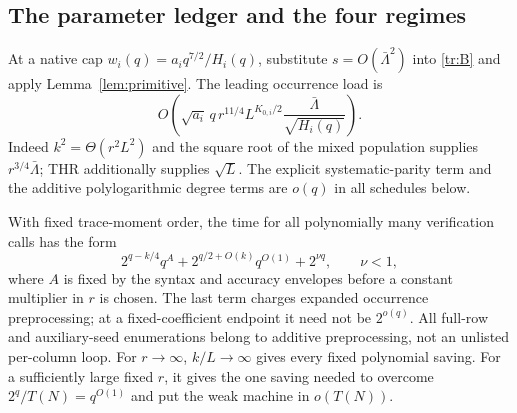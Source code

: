 \documentclass[11pt,letterpaper]{article}
\theoremstyle{definition}
\theoremstyle{remark}
\begin{document}
\subsection{The parameter ledger and the four regimes}
\label{tr:parameters}

At a native cap $w_i(q)=a_iq^{7/2}/H_i(q)$, substitute
$s=O(\bar\Lambda^2)$ into \eqref{tr:B} and apply
Lemma~\ref{lem:primitive}. The leading occurrence load is
\begin{equation}
 O\left(\sqrt{a_i}\,q\,r^{11/4}L^{K_{0,i}/2}
                   \frac{\bar\Lambda}{\sqrt{H_i(q)}}\right).
 \label{tr:load}
\end{equation}
Indeed $k^2=\Theta(r^2L^2)$ and the square root of the mixed
population supplies $r^{3/4}\bar\Lambda$; THR additionally supplies
$\sqrt L$. The explicit systematic-parity term and the additive
polylogarithmic degree terms are $o(q)$ in all schedules below.

With fixed trace-moment order, the time for all polynomially many
verification calls has the form
\begin{equation}
 2^{q-k/4}q^A+2^{q/2+O(k)}q^{O(1)}+2^{\nu q},\qquad \nu<1,
 \label{tr:time}
\end{equation}
where $A$ is fixed by the syntax and accuracy envelopes before a
constant multiplier in $r$ is chosen. The last term charges expanded
occurrence preprocessing; at a fixed-coefficient endpoint it need not
be $2^{o(q)}$. All full-row and auxiliary-seed enumerations belong
to additive preprocessing, not an unlisted per-column loop.
For $r\to\infty$, $k/L\to\infty$ gives every fixed polynomial
saving. For a sufficiently large fixed $r$, it gives the one saving
needed to overcome $2^q/T(N)=q^{O(1)}$ and put the weak machine in
$o(T(N))$.
\end{document}
